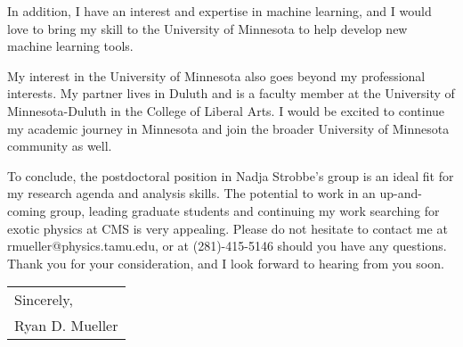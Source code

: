 \documentclass[11pt]{article}
\begin{document}
In addition, I have an interest and expertise in machine learning, and I would love to bring my skill to the University of Minnesota to help develop new machine learning tools.


My interest in the University of Minnesota also goes beyond my professional interests. My partner lives in Duluth and is a faculty member at the University of Minnesota-Duluth in the College of Liberal Arts. I would be excited to continue my academic journey in Minnesota and join the broader University of Minnesota community as well. 

To conclude, the postdoctoral position in Nadja Strobbe’s group is an ideal fit for my research agenda and analysis skills. The potential to work in an up-and-coming group, leading graduate students and continuing my work searching for exotic physics at CMS is very appealing. Please do not hesitate to contact me at rmueller@physics.tamu.edu, or at (281)-415-5146 should you have any questions. Thank you for your consideration, and I look forward to hearing from you soon.



\bigskip

\begin{tabular}{@{}l@{}}
Sincerely, \\
  [.4em]
  Ryan D. Mueller
\end{tabular}
\end{document}
